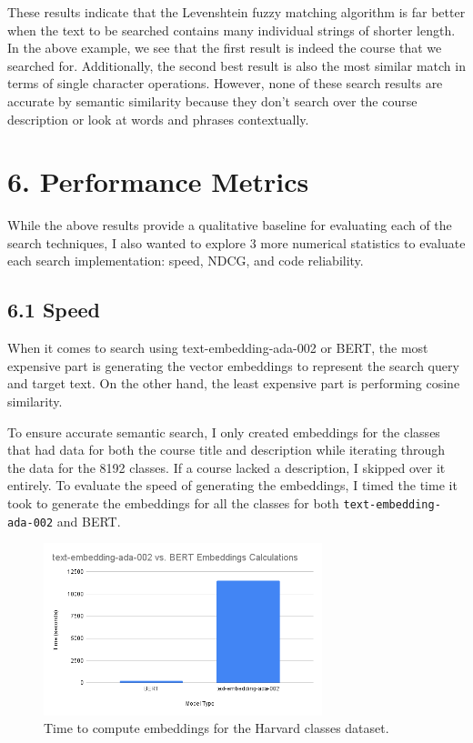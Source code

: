 \documentclass[
	a4paper, %
	10pt, %
	unnumberedsections, %
	twoside, %
]{LTJournalArticle}
\begin{document}
These results indicate that the Levenshtein fuzzy matching algorithm is far better when the text to be searched contains many individual strings of shorter length. In the above example, we see that the first result is indeed the course that we searched for. Additionally, the second best result is also the most similar match in terms of single character operations. However, none of these search results are accurate by semantic similarity because they don't search over the course description or look at words and phrases contextually.

\section{6. Performance Metrics}

While the above results provide a qualitative baseline for evaluating each of the search techniques, I also wanted to explore $3$ more numerical statistics to evaluate each search implementation: speed, NDCG, and code reliability. 

\subsection{6.1 Speed}


When it comes to search using text-embedding-ada-002 or BERT, the most expensive part is generating the vector embeddings to represent the search query and target text. On the other hand, the least expensive part is performing cosine similarity. 

To ensure accurate semantic search, I only created embeddings for the classes that had data for both the course title and description while iterating through the data for the 8192 classes. If a course lacked a description, I skipped over it entirely. To evaluate the speed of generating the embeddings, I timed the time it took to generate the embeddings for all the classes for both \texttt{text-embedding-ada-002} and BERT. 


\begin{figure}[h]
    \includegraphics[width=8.1cm]{embeddingscal.png}
    \caption{Time to compute embeddings for the Harvard classes dataset.}
\end{figure}
\end{document}
